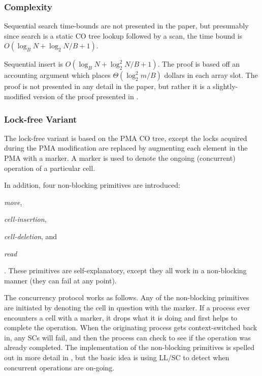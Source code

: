 \documentclass{style}
\begin{document}
\subsubsection{Complexity}

Sequential search time-bounds are not presented in the paper,
but presumably since search is a static CO tree lookup followed
by a scan, the time bound is $O(\log_{B}{N} + {\log_2{N}}/{B} + 1)$.

Sequential insert is $O(\log_{B}{N} + \log_2^2{N}/{B} + 1)$. The proof
is based off an accounting argument which places $\Theta(\log_2^2{m}/B)$
dollars in each array slot. The proof is not presented in any detail in the
paper, but rather it is a slightly-modified version of the proof presented
in \cite{Katriel02}. 

\subsubsection{Lock-free Variant}
The lock-free variant is based on the PMA CO tree, except the locks acquired
during the PMA modification are replaced by augmenting each element in the PMA
with a marker. A marker is used to denote the ongoing (concurrent) operation
of a particular cell.

In addition, four non-blocking primitives are introduced:
\begin{inparaenum}[(a)]
  \item \textit{move},
  \item \textit{cell-insertion},
  \item \textit{cell-deletion}, and
  \item \textit{read}
\end{inparaenum}. These primitives are self-explanatory, except they
all work in a non-blocking manner (they can fail at any point).

The concurrency protocol works as follows. Any of the non-blocking primitives
are initiated by denoting the cell in question with the marker. If a process
ever encounters a cell with a marker, it drops what it is doing and first helps
to complete the operation. When the originating process gets context-switched
back in, any SCs will fail, and then the process can check to see if the
operation was already completed. The implementation of the non-blocking
primitives is spelled out in more detail in \cite{BenderFiGi05}, but the basic
idea is using LL/SC to detect when concurrent operations are on-going.
\end{document}
